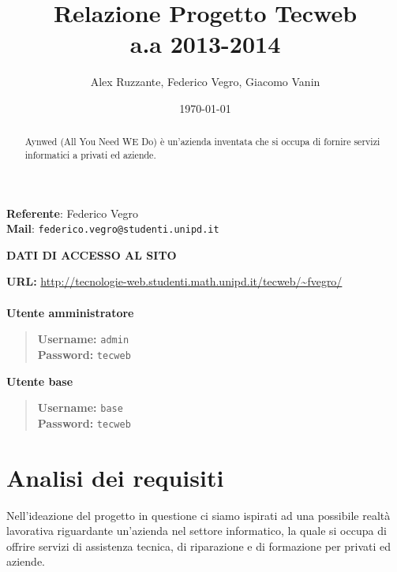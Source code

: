 \documentclass[a4paper]{article}
\begin{document}
\title{Relazione Progetto Tecweb \\a.a 2013-2014}
\author{Alex Ruzzante, Federico Vegro, Giacomo Vanin}
\date{\today}

\maketitle
\textbf{Referente}: Federico Vegro \\
\textbf{Mail}: \verb=federico.vegro@studenti.unipd.it= \\
\begin{center}
\textbf{DATI DI ACCESSO AL SITO}
\end{center}
\textbf{URL: } \url{http://tecnologie-web.studenti.math.unipd.it/tecweb/~fvegro/}\\\\
\textbf{Utente amministratore}
\begin{quote}
	\textbf{Username: } \verb=admin= \\
	\textbf{Password: } \verb=tecweb= \\
\end{quote}
\textbf{Utente base}
\begin{quote}
	\textbf{Username: } \verb=base= \\
	\textbf{Password: } \verb=tecweb= \\
\end{quote}

\newpage

\begin{abstract}
	Aynwed (All You Need WE Do) è un'azienda inventata che si occupa di fornire servizi informatici a privati ed aziende.
\end{abstract}
\tableofcontents
\newpage
%
%
%
%
\section{Analisi dei requisiti}
Nell'ideazione del progetto in questione ci siamo ispirati ad una possibile realtà lavorativa riguardante un'azienda nel settore informatico, la quale si occupa di offrire servizi di assistenza tecnica, di riparazione e di formazione per privati ed aziende.
\end{document}
